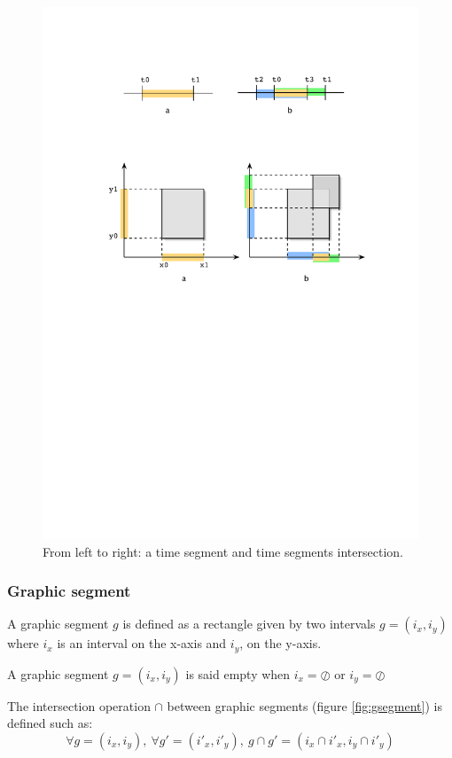 \documentclass{article}
\newcommand{\emptyseg}		{\ensuremath{\oslash}}
\begin{document}
\vspace{-4mm}
\begin{figure}[htbp]
\centerline{
	\includegraphics[width=0.8\columnwidth]{imgs/segments1D}}
\caption{From left to right: a time segment and time segments intersection.}
\label{fig:tsegment}
\end{figure}


\subsubsection{Graphic segment}
A graphic segment $g$ is defined as a rectangle given by two intervals $g=(i_x,i_y)$ where $i_x$ is an interval on the x-axis and $i_y$, on the y-axis.

A graphic segment $g=(i_x,i_y)$ is said empty when $i_x = \emptyseg $ or $i_y = \emptyseg $

The intersection operation $\cap$ between graphic segments (figure \ref{fig:gsegment}) is defined such as:
{\small
\[ \forall g=(i_x,i_y),\ \forall  g'=(i'_x,i'_y),\ 
g \cap g' = (i_x \cap i'_x, i_y \cap i'_y)
\]
}
\end{document}
